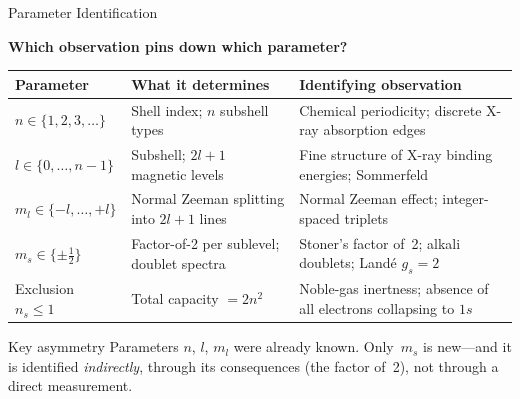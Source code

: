 \documentclass[aspectratio=169,12pt]{beamer}
\begin{document}
\begin{frame}[shrink=40]{Parameter Identification}

\textbf{Which observation pins down which parameter?}

\bigskip
\begin{center}
\renewcommand{\arraystretch}{1.2}
\begin{tabular}{p{3.2cm}p{4.5cm}p{5.5cm}}
\toprule
\textbf{Parameter} & \textbf{What it determines} & \textbf{Identifying observation} \\
\midrule
$n\in\{1,2,3,\ldots\}$ & Shell index; $n$ subshell types &
  Chemical periodicity; discrete X-ray absorption edges \\[4pt]
$l\in\{0,\ldots,n-1\}$ & Subshell; $2l+1$ magnetic levels &
  Fine structure of X-ray binding energies; Sommerfeld \\[4pt]
$m_l\in\{-l,\ldots,+l\}$ & Normal Zeeman splitting into $2l+1$ lines &
  Normal Zeeman effect; integer-spaced triplets \\[4pt]
$m_s\in\{\pm\tfrac{1}{2}\}$ & Factor-of-2 per sublevel; doublet spectra &
  Stoner's factor of~2; alkali doublets; Landé $g_s=2$ \\[4pt]
Exclusion $n_s\leq 1$ & Total capacity $= 2n^2$ &
  Noble-gas inertness; absence of all electrons collapsing to $1s$ \\
\bottomrule
\end{tabular}
\end{center}

\bigskip
\begin{alertblock}{Key asymmetry}
Parameters $n$, $l$, $m_l$ were already known.  Only~$m_s$ is new---and it
is identified \emph{indirectly}, through its consequences (the factor of~2),
not through a direct measurement.
\end{alertblock}

\end{frame}
\end{document}
